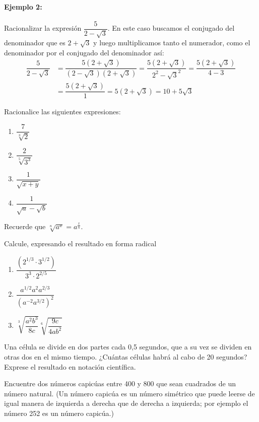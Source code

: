 \documentclass[letterpaper,10pt,twoside]{article}
\begin{document}
\begin{enumerate}
\begin{multicols}{2}
\paragraph{Ejemplo 2:} Racionalizar la expresión $ \dfrac{5}{2-\sqrt{3}} $. En este caso buscamos el conjugado del denominador que es $ 2+\sqrt{3} $ y luego multiplicamos tanto el numerador, como el denominador por el conjugado del denominador así:
\begin{align*}
\dfrac{5}{2-\sqrt{3}}&=\dfrac{5(2+\sqrt{3})}{(2-\sqrt{3})(2+\sqrt{3})}=\dfrac{5(2+\sqrt{3})}{2^2-\sqrt{3}^2}=\dfrac{5(2+\sqrt{3})}{4-3}\\
&=\dfrac{5(2+\sqrt{3})}{1}=5(2+\sqrt{3})=10+5\sqrt{3}
\end{align*}
  \item Racionalice las siguientes expresiones:
  \begin{multicols}{2}
  \begin{enumerate}
    \item $ \dfrac{7}{\sqrt[3]{2}} $ \item $ \dfrac{2}{\sqrt[5]{3^3}} $
    \item $ \dfrac{1}{\sqrt{x+y}} $ \item $ \dfrac{1}{\sqrt{a}-\sqrt{b}} $
  \end{enumerate}
  \end{multicols}
  Recuerde que $ \sqrt[n]{a^x}=a^{\frac{x}{n}} $.
  \item Calcule, expresando el resultado en forma radical
  \begin{multicols}{2}
    \begin{enumerate}
      \item $ \dfrac{(2^{1/3}\cdot3^{1/2})}{3^3\cdot2^{2/5}} $
      \item $ \dfrac{a^{1/2}a^2a^{2/3}}{(a^{-2}a^{3/2})^2} $
      \item $ \sqrt[3]{\dfrac{a^2b^3}{8c}}\sqrt[6]{\dfrac{9c}{4ab^2}} $
    \end{enumerate}
      \end{multicols}
    \item Una célula se divide en dos partes cada 0,5 segundos, que a su vez se dividen en otras dos en el mismo tiempo. ¿Cuántas células habrá al cabo de 20 segundos? Exprese el resultado en notación científica.
    \item Encuentre dos números capicúas entre 400 y 800 que sean cuadrados de un número natural. (Un número capicúa es un número simétrico que puede leerse de igual manera de izquierda a derecha que de derecha a izquierda; por ejemplo el número 252 es un número capicúa.)

\end{multicols}
\end{enumerate}
\end{document}

